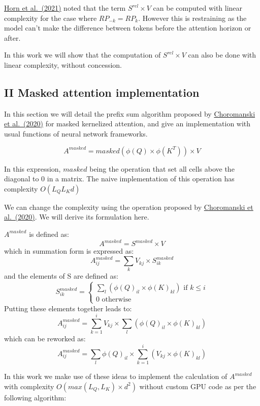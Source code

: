 \href{https://arxiv.org/abs/2102.07680}{Horn et al.~(2021)} noted that
the term \(S^{rel} \times V\) can be computed with linear complexity for
the case where \(RP_{-k} = RP_{k}\). However this is restraining as the
model can't make the difference between tokens before the attention
horizon or after.

In this work we will show that the computation of \(S^{rel} \times V\)
can also be done with linear complexity, without concession.

\hypertarget{ii-masked-attention-implementation}{%
\subsection{II Masked attention
implementation}\label{ii-masked-attention-implementation}}

In this section we will detail the prefix sum algorithm proposed by
\href{https://arxiv.org/abs/2009.14794}{Choromanski et al.~(2020)} for
masked kernelized attention, and give an implementation with usual
functions of neural network frameworks.

\[A^{masked} = masked \left( \phi(Q) \times \phi(K^T) \right) \times V\]

In this expression, \(masked\) being the operation that set all cells
above the diagonal to 0 in a matrix. The naive implementation of this
operation has complexity \(O(L_QL_Kd)\)

We can change the complexity using the operation proposed by
\href{https://arxiv.org/abs/2009.14794}{Choromanski et al.~(2020)}. We
will derive its formulation here.

\(A^{masked}\) is defined as: \[A^{masked} = S^{masked} \times V\] which
in summation form is expressed as:
\[A^{masked}_{ij} = \sum_k V_{kj} \times S^{masked}_{ik}\] and the
elements of S are defined as: \[S^{masked}_{ik} =
\begin{cases}
    \sum_l \left( \phi(Q)_{il} \times \phi(K)_{kl} \right) \text{ if } k \leq i\\
    0 \text{ otherwise}
\end{cases}\] Putting these elements together leads to:
\[A^{masked}_{ij}= \sum_{k=1}^i V_{kj} \times \sum_l \left( \phi(Q)_{il} \times \phi(K)_{kl} \right)\]
which can be reworked as:
\[A^{masked}_{ij}= \sum_l \phi(Q)_{il} \times \sum_{k=1}^i \left( V_{kj} \times \phi(K)_{kl} \right)\]

In this work we make use of these ideas to implement the calculation of
\(A^{masked}\) with complexity \(O(max(L_Q, L_K) \times d^2)\) without
custom GPU code as per the following algorithm:

